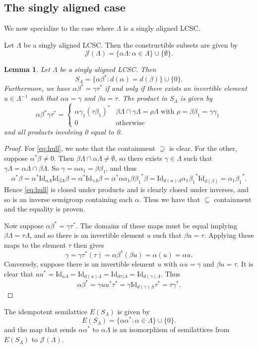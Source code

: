 \documentclass[12pt]{amsart}
\newtheorem{lemma}[thm]{Lemma}
\theoremstyle{definition}
\theoremstyle{remark}
\numberwithin{equation}{section}
\newcommand{\Id}{\text{Id}}
\renewcommand{\L}{\Lambda}
\renewcommand{\a}{\alpha}
\renewcommand{\b}{\beta}
\newcommand{\J}{\mathcal{J}}
\newcommand{\ga}{\gamma}
\begin{document}
	
	\subsection{The singly aligned case}
	
	We now specialize to the case where $\L$ is a singly aligned LCSC. 
	
	Let $\L$ be a singly aligned LCSC. Then the constructible subsets are given by
	\[
	\J(\L) = \{\a\L: \a\in \L\}\cup\{\emptyset\}.
	\] 
	\begin{lemma}\label{lem:hull_form}
		Let $\L$ be a singly aligned LCSC. Then
		\begin{equation}\label{eq:hull}
		S_\L = \{\a \b^*: d(\a) = d(\b)\}\cup\{0\}.
		\end{equation}
		Furthermore, we have $\a \b^* = \gamma \tau^*$ if and only if there exists an invertible element $u\in\L^{-1}$ such that $\a u = \gamma$ and $\b u = \tau$. The product in $S_\L$ is given by
		\[
		\a\b^*\ga\tau^* = \begin{cases}
			\a\gamma_1(\tau\b_1)^*& \b\L\cap \gamma\L = \rho\L\text{ with }\rho = \b\b_1 = \gamma\gamma_1\\
			0&\text{otherwise}
		\end{cases}
		\]
		and all products involving 0 equal to 0. 
\end{lemma} 
\begin{proof}
	For \eqref{eq:hull}, we note that the containment $\supseteq$ is clear. For the other, suppose $\a^*\b \neq 0$. Then $\b\L\cap \a\L \neq \emptyset$, so there exists $\gamma\in\L$ such that $\gamma\L= \a\L\cap \b\L$. So $\gamma = \a\a_1 = \b\b_1$, and thus
	\[
	\a^*\b = \a^* \Id_{\a\L}\Id_{\b\L}\b =  \a^*\Id_{\gamma\L}\b = \a^*{\a\a_1}{\b\b_1}^*{\b} = \Id_{d(\a)\L}{\a_1}{\b_1}^*\Id_{d(\b)} = {\a_1}{\b_1}^*.
	\]
	Hence \eqref{eq:hull} is closed under products and is clearly closed under inverses, and so is an inverse semigroup containing each $\a$. Thus we have that $\subseteq$ containment and the equality is proven.
	
	Now suppose $\a \b^* = \gamma \tau^*$. The domains of these maps must be equal implying $\b\L = \tau\L$, and so there is an invertible element $u$ such that $\b u = \tau$. Applying these maps to the element $\tau$ then gives
	\[
	\gamma = \gamma \tau^*(\tau) = \a \b^*(\b u) = {\a}(u) = \a u.
	\]
	Conversely, suppose there is an invertible element $u$ with $\a u = \gamma$ and $\b u = \tau$. It is clear that $uu^* = \Id_{u\L}= \Id_{d(u)\L} = \Id_{d\tau)\L} = \Id_{d(\gamma)\L}$. Thus
	\[
	\a \b^* = \gamma uu^* \tau^* = \gamma \Id_{d(\gamma)\L}\tau^* = \tau \gamma^*.
	\]
\end{proof}
The idempotent semilattice $E(S_\L)$ is given by
\[
E(S_\L) = \{\a \a^*:\a\in\L\}\cup\{0\}.
\]
	and the map that sends $\a \a^*$ to $\a\L$ is an isomorphism of semilattices from $E(S_\L)$ to $\J(\L)$. 
\end{document}

